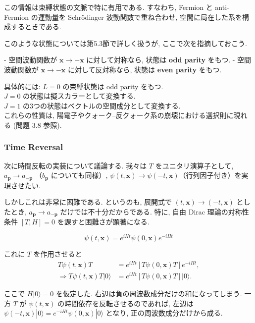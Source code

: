 \documentclass[a4paper,12pt]{article}
\begin{document}
この情報は束縛状態の文脈で特に有用である. すなわち, Fermion と anti-Fermion の運動量を Schrödinger 波動関数で重ね合わせ, 空間に局在した系を構成するときである.  

このような状態については第5.3節で詳しく扱うが, ここで次を指摘しておこう.  

- 空間波動関数が $\mathbf{x}\to-\mathbf{x}$ に対して対称なら, 状態は \textbf{odd parity} をもつ.  
- 空間波動関数が $\mathbf{x}\to-\mathbf{x}$ に対して反対称なら, 状態は \textbf{even parity} をもつ.  

具体的には:  
$L=0$ の束縛状態は odd parity をもつ.\\
$J=0$ の状態は擬スカラーとして変換する.\\ 
$J=1$ の3つの状態はベクトルの空間成分として変換する.\\

これらの性質は, 陽電子やクォーク–反クォーク系の崩壊における選択則に現れる (問題 3.8 参照).

\subsubsection*{Time Reversal}

次に時間反転の実装について議論する.  
我々は $T$ をユニタリ演算子として, $a_{\mathbf{p}} \to a_{-\mathbf{p}}$ （$b_{\mathbf{p}}$ についても同様）,  
$\psi(t,\mathbf{x}) \to \psi(-t,\mathbf{x})$（行列因子付き）を実現させたい.  

しかしこれは非常に困難である.  
というのも, 展開式で $(t,\mathbf{x}) \to (-t,\mathbf{x})$ としたとき, $a_{\mathbf{p}} \to a_{-\mathbf{p}}$ だけでは不十分だからである.  
特に, 自由 Dirac 理論の対称性条件 $[T,H]=0$ を課すと困難さが顕著になる.  

\begin{equation*}
\psi(t,\mathbf{x}) = e^{iHt}\psi(0,\mathbf{x})e^{-iHt}
\end{equation*}

これに $T$ を作用させると
\begin{align*}
T\psi(t,\mathbf{x})T &= e^{iHt}[T\psi(0,\mathbf{x})T] e^{-iHt}, \\
\Rightarrow T\psi(t,\mathbf{x})T|0\rangle &= e^{iHt}[T\psi(0,\mathbf{x})T]|0\rangle.
\end{align*}

ここで $H|0\rangle=0$ を仮定した.  
右辺は負の周波数成分だけの和になってしまう.  
一方 $T$ が $\psi(t,\mathbf{x})$ の時間依存を反転させるのであれば, 左辺は $\psi(-t,\mathbf{x})|0\rangle=e^{-iHt}\psi(0,\mathbf{x})|0\rangle$ となり, 正の周波数成分だけから成る.  
\end{document}
